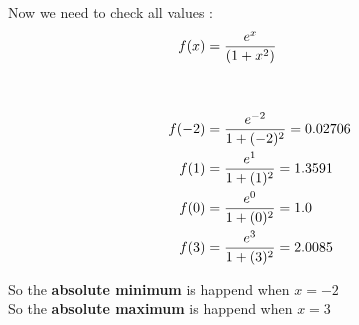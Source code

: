 Now we need to check all values :
\begin{align}
\begin{split}
    f(x) &= \frac{e^x}{(1 + x^2)}
    \\
    \\
    \\
    f(-2) &= \frac{e^{-2}}{1 + (-2)^2} = 0.02706
    \\
    f(1) &= \frac{e^{1}}{1 + (1)^2} = 1.3591
    \\
    f(0) &= \frac{e^{0}}{1 + (0)^2} = 1.0
    \\
    f(3) &= \frac{e^{3}}{1 + (3)^2} = 2.0085
\notag
\end{split}
\end{align}

So the \textbf{absolute minimum} is happend when $x = -2$
\\
So the \textbf{absolute maximum} is happend when $x = 3$
